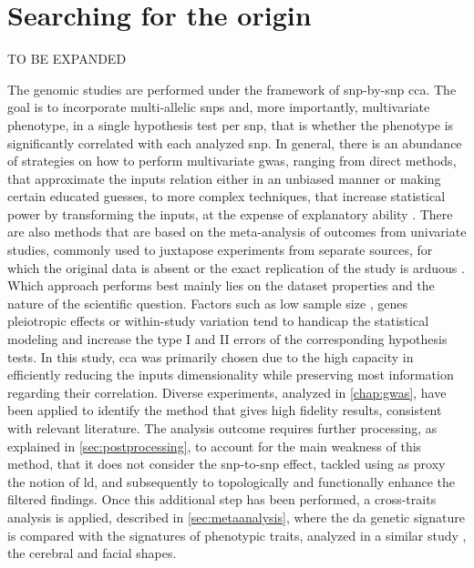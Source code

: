 \section{Searching for the origin}
TO BE EXPANDED

The genomic studies are performed under the framework of \ac{snp}-by-\ac{snp} \ac{cca}. The goal is to incorporate multi-allelic \acp{snp} and, more importantly, multivariate phenotype, in a single hypothesis test per \ac{snp}, that is whether the phenotype is significantly correlated with each analyzed \ac{snp}. In general, there is an abundance of strategies on how to perform multivariate \ac{gwas}, ranging from direct methods, that approximate the inputs relation either in an unbiased manner or making certain educated guesses, to more complex techniques, that increase statistical power by transforming the inputs, at the expense of explanatory ability \cite{Galesloot2014}. There are also methods that are based on the meta-analysis of outcomes from univariate studies, commonly used to juxtapose experiments from separate sources, for which the original data is absent or the exact replication of the study is arduous \cite{Cichonska2016}. Which approach performs best mainly lies on the dataset properties and the nature of the scientific question. Factors such as low sample size \cite{Sheng2021}, genes pleiotropic effects \cite{Fernandes2021} or within-study variation \cite{Jackson2011} tend to handicap the statistical modeling and increase the type I and II errors of the corresponding hypothesis tests. In this study, \ac{cca} was primarily chosen due to the high capacity in efficiently reducing the inputs dimensionality while preserving most information regarding their correlation. Diverse experiments, analyzed in \autoref{chap:gwas}, have been applied to identify the method that gives high fidelity results, consistent with relevant literature. The analysis outcome requires further processing, as explained in \autoref{sec:postprocessing}, to account for the main weakness of this method, that it does not consider the \ac{snp}-to-\ac{snp} effect, tackled using as proxy the notion of \ac{ld}, and subsequently to topologically and functionally enhance the filtered findings. Once this additional step has been performed, a cross-traits analysis is applied, described in \autoref{sec:metaanalysis}, where the \ac{da} genetic signature is compared with the signatures of phenotypic traits, analyzed in a similar study \cite{Naqvi2021}, the cerebral and facial shapes.



